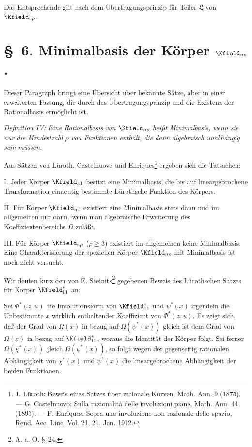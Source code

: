 \documentclass[11pt]{article}
\begin{document}
Das Entsprechende gilt nach dem Übertragungsprinzip für Teiler $\mathfrak{L}$ von $\Kfield_{n\rho}$.

\section*{\S\ 6. Minimalbasis der Körper $\Kfield_{n\rho}$.}

Dieser Paragraph bringt eine Übersicht über bekannte Sätze, aber in einer erweiterten Fassung, die durch das Übertragungsprinzip und die Existenz der Rationalbasis ermöglicht ist.

\emph{Definition IV: Eine Rationalbasis von $\Kfield_{n\rho}$ heißt Minimalbasis, wenn sie nur die Mindestzahl $\rho$ von Funktionen enthält, die dann algebraisch unabhängig sein müssen.}

Aus Sätzen von Lüroth, Castelnuovo und Enriques\footnote{J. Lüroth: Beweis eines Satzes über rationale Kurven, Math. Ann. 9 (1875). --- G. Castelnuovo: Sulla razionalità delle involuzioni piane, Math. Ann. 44 (1893). --- F. Enriques: Sopra una involuzione non razionale dello spazio, Rend. Acc. Linc, Vol. 21, 21. Jan. 1912.} ergeben sich die Tatsachen:

I. Jeder Körper $\Kfield_{n1}$ besitzt eine Minimalbasis, die bis auf lineargebrochene Transformation eindeutig bestimmte Lürothsche Funktion des Körpers.

II. Für Körper $\Kfield_{n2}$ existiert eine Minimalbasis stets dann und im allgemeinen nur dann, wenn man algebraische Erweiterung des Koeffizientenbereichs $\Omega$ zuläßt.

III. Für Körper $\Kfield_{n\rho}$ ($\rho\ge3$) existiert im allgemeinen keine Minimalbasis. Eine Charakterisierung der speziellen Körper $\Kfield_{n\rho}$ mit Minimalbasis ist noch nicht versucht.

Wir deuten kurz den von E. Steinitz\footnote{A. a. O. \S\ 24.} gegebenen Beweis des Lürothschen Satzes für Körper $\Kfield^*_{11}$ an:

Sei $\Phi^*(z,u)$ die Involutionsform von $\Kfield^*_{11}$ und $\psi^*(x)$ irgendein die Unbestimmte $x$ wirklich enthaltender Koeffizient von $\Phi^*(z,u)$. Es zeigt sich, daß der Grad von $\Omega(x)$ in bezug auf $\Omega(\psi^*(x))$ gleich ist dem Grad von $\Omega(x)$ in bezug auf $\Kfield^*_{11}$, woraus die Identität der Körper folgt. Sei ferner $\Omega(\chi^*(x))$ gleich $\Omega(\psi^*(x))$, so folgt wegen der gegenseitig rationalen Abhängigkeit von $\chi^*(x)$ und $\psi^*(x)$ die lineargebrochene Abhängigkeit der beiden Funktionen.
\end{document}
